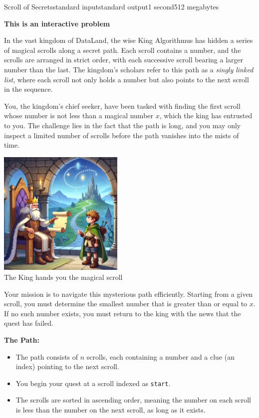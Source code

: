 \begin{problem}{Scroll of Secrets}{standard input}{standard output}{1 second}{512 megabytes}

\textbf{This is an interactive problem}

In the vast kingdom of DataLand, the wise King Algorithmus has hidden a series of magical scrolls along a secret path. Each scroll contains a number, and the scrolls are arranged in strict order, with each successive scroll bearing a larger number than the last. The kingdom's scholars refer to this path as a \textit{singly linked list}, where each scroll not only holds a number but also points to the next scroll in the sequence.

You, the kingdom's chief seeker, have been tasked with finding the first scroll whose number is not less than a magical number $x$, which the king has entrusted to you. The challenge lies in the fact that the path is long, and you may only inspect a limited number of scrolls before the path vanishes into the mists of time.

\begin{center}
  \def \htmlPixelsInCm {45}  %
  \includegraphics[width=6cm]{scroll.jpg} \\
  \small{The King hands you the magical scroll}
\end{center}

Your mission is to navigate this mysterious path efficiently. Starting from a given scroll, you must determine the smallest number that is greater than or equal to $x$. If no such number exists, you must return to the king with the news that the quest has failed.

\textbf{The Path:}
\begin{itemize}
    \item The path consists of $n$ scrolls, each containing a number and a clue (an index) pointing to the next scroll.
    \item You begin your quest at a scroll indexed as \texttt{start}.
    \item The scrolls are sorted in ascending order, meaning the number on each scroll is less than the number on the next scroll, as long as it exists.
\end{itemize}


\end{problem}
